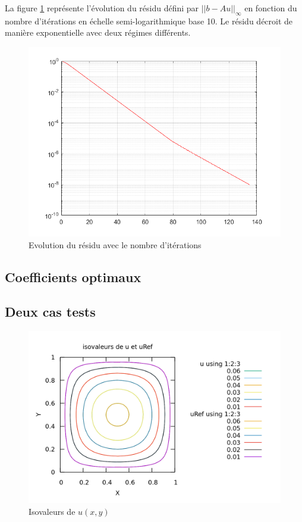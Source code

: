 \documentclass{article}
\begin{document}
La figure \ref{res} représente l'évolution du résidu défini par $||b-Au||_\infty$ en fonction du
nombre d'itérations en échelle semi-logarithmique base 10.
Le résidu décroit de manière exponentielle avec deux régimes différents.
\begin{figure}[h!]
 \centering
\includegraphics[scale=0.5]{convergence.png}
\caption{Evolution du résidu avec le nombre d'itérations}
\label{res}
\end{figure}

\subsection{Coefficients optimaux}



\subsection{Deux cas tests}

\begin{figure}[h!]
 \centering
\includegraphics[scale=0.5]{isovaleurs.png}
\caption{Isovaleurs de $u(x,y)$}
\label{iso}
\end{figure}
\end{document}
